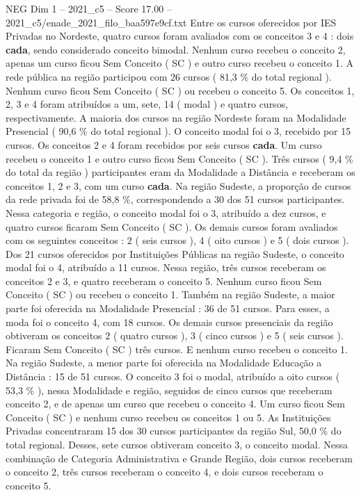 \begin{textsample}{NEG Dim 1 – 2021\_c5 – Score 17.00 – 2021\_c5/enade\_2021\_filo\_baa597e9cf.txt}
Entre os cursos oferecidos por IES Privadas no Nordeste, quatro cursos foram avaliados com os conceitos 3 e 4 : dois \textbf{cada}, sendo considerado conceito bimodal.
Nenhum curso recebeu o conceito 2, apenas um curso ficou Sem Conceito ( SC ) e outro curso recebeu o conceito 1.
A rede pública na região participou com 26 cursos ( 81,3 \% do total regional ).
Nenhum curso ficou Sem Conceito ( SC ) ou recebeu o conceito 5.
Os conceitos 1, 2, 3 e 4 foram atribuídos a um, sete, 14 ( modal ) e quatro cursos, respectivamente.
A maioria dos cursos na região Nordeste foram na Modalidade Presencial ( 90,6 \% do total regional ).
O conceito modal foi o 3, recebido por 15 cursos.
Os conceitos 2 e 4 foram recebidos por seis cursos \textbf{cada}.
Um curso recebeu o conceito 1 e outro curso ficou Sem Conceito ( SC ).
Três cursos ( 9,4 \% do total da região ) participantes eram da Modalidade a Distância e receberam os conceitos 1, 2 e 3, com um curso \textbf{cada}.
Na região Sudeste, a proporção de cursos da rede privada foi de 58,8 \%, correspondendo a 30 dos 51 cursos participantes.
Nessa categoria e região, o conceito modal foi o 3, atribuído a dez cursos, e quatro cursos ficaram Sem Conceito ( SC ).
Os demais cursos foram avaliados com os seguintes conceitos : 2 ( seis cursos ), 4 ( oito cursos ) e 5 ( dois cursos ).
Dos 21 cursos oferecidos por Instituições Públicas na região Sudeste, o conceito modal foi o 4, atribuído a 11 cursos.
Nessa região, três cursos receberam os conceitos 2 e 3, e quatro receberam o conceito 5.
Nenhum curso ficou Sem Conceito ( SC ) ou recebeu o conceito 1.
Também na região Sudeste, a maior parte foi oferecida na Modalidade Presencial : 36 de 51 cursos.
Para esses, a moda foi o conceito 4, com 18 cursos.
Os demais cursos presenciais da região obtiveram os conceitos 2 ( quatro cursos ), 3 ( cinco cursos ) e 5 ( seis cursos ).
Ficaram Sem Conceito ( SC ) três cursos.
E nenhum curso recebeu o conceito 1.
Na região Sudeste, a menor parte foi oferecida na Modalidade Educação a Distância : 15 de 51 cursos.
O conceito 3 foi o modal, atribuído a oito cursos ( 53,3 \% ), nessa Modalidade e região, seguidos de cinco cursos que receberam conceito 2, e de apenas um curso que recebeu o conceito 4.
Um curso ficou Sem Conceito ( SC ) e nenhum curso recebeu os conceitos 1 ou 5.
As Instituições Privadas concentraram 15 dos 30 cursos participantes da região Sul, 50,0 \% do total regional.
Desses, sete cursos obtiveram conceito 3, o conceito modal.
Nessa combinação de Categoria Administrativa e Grande Região, dois cursos receberam o conceito 2, três cursos receberam o conceito 4, e dois cursos receberam o conceito 5.

\end{textsample}
